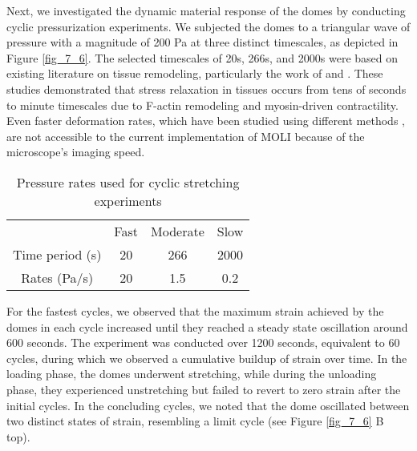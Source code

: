 Next, we investigated the dynamic material response of the domes by conducting cyclic pressurization experiments. We subjected the domes to a triangular wave of pressure with a magnitude of 200 Pa at three distinct timescales, as depicted in Figure \ref{fig_7_6}. The selected timescales of 20s, 266s, and 2000s were based on existing literature on tissue remodeling, particularly the work of \citet{khalilgharibi2019} and \citet{casares2015}. These studies demonstrated that stress relaxation in tissues occurs from tens of seconds to minute timescales due to F-actin remodeling and myosin-driven contractility. Even faster deformation rates, which have been studied using different methods \cite{khalilgharibi2019}, are not accessible to the current implementation of MOLI because of the microscope’s imaging speed.
\begin{center}
	\begin{table}[h!]
		\label{tab:hysteresis}
		\centering
		\begin{tabular}{c c c c}
			& Fast & Moderate & Slow \\ 
			Time period (s) & 20   & 266      & 2000 \\ 
			Rates (Pa/s)    & 20   & 1.5      & 0.2  \\ 
		\end{tabular}
		\caption{Pressure rates used for cyclic stretching experiments}
	\end{table}
\end{center}
\vspace{-2em}

For the fastest cycles, we observed that the maximum strain achieved by the domes in each cycle increased until they reached a steady state oscillation around 600 seconds.
The experiment was conducted over 1200 seconds, equivalent to 60 cycles, during which we observed a cumulative buildup of strain over time. In the loading phase, the domes underwent stretching, while during the unloading phase, they experienced unstretching but failed to revert to zero strain after the initial cycles. In the concluding cycles, we noted that the dome oscillated between two distinct states of strain, resembling a limit cycle (see Figure \ref{fig_7_6} B top).

